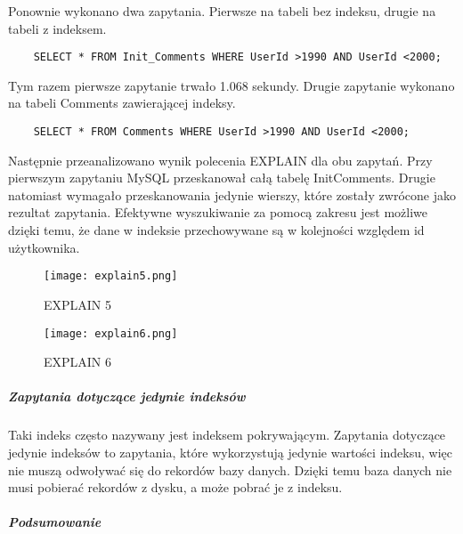 Ponownie wykonano dwa zapytania. Pierwsze na tabeli bez indeksu, drugie na tabeli z indeksem.
\begin{verbatim}
    SELECT * FROM Init_Comments WHERE UserId >1990 AND UserId <2000;
\end{verbatim}

Tym razem pierwsze zapytanie trwało 1.068 sekundy. Drugie zapytanie wykonano na tabeli Comments zawierającej indeksy.
\begin{verbatim}
    SELECT * FROM Comments WHERE UserId >1990 AND UserId <2000;
\end{verbatim}
Następnie przeanalizowano wynik polecenia EXPLAIN dla obu zapytań. Przy pierwszym zapytaniu MySQL przeskanował całą tabelę Init\textunderscore Comments. Drugie natomiast wymagało przeskanowania jedynie wierszy, które zostały zwrócone jako rezultat zapytania.
Efektywne wyszukiwanie za pomocą zakresu jest możliwe dzięki temu, że dane w indeksie przechowywane są w kolejności względem id użytkownika.
\begin{figure}[h]
    \texttt{[image: explain5.png]} 
    \caption{EXPLAIN 5}
\end{figure}

\begin{figure}[h]
    \texttt{[image: explain6.png]} 
    \caption{EXPLAIN 6}
\end{figure}



\subparagraph{Zapytania dotyczące jedynie indeksów}\mbox{} \newline
Taki indeks często nazywany jest indeksem pokrywającym. Zapytania dotyczące jedynie indeksów to zapytania, które wykorzystują jedynie wartości indeksu, więc nie muszą odwoływać się do rekordów bazy danych. Dzięki temu baza danych nie musi pobierać rekordów z dysku, a może pobrać je z indeksu.


\subparagraph{Podsumowanie}\mbox{} \newline


